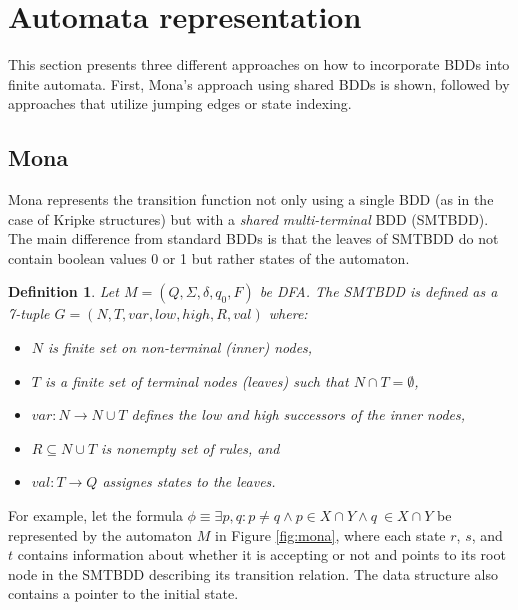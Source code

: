 \documentclass[pdflatex,sn-mathphys-num]{sn-jnl}%
\theoremstyle{thmstyleone}%
\theoremstyle{thmstyletwo}%
\theoremstyle{thmstylethree}%
\newtheorem{definition}{Definition}%
\begin{document}
\section{Automata representation}
    This section presents three different approaches on how to incorporate BDDs into finite automata. First, Mona's approach using shared BDDs is shown, followed by approaches that utilize jumping edges or state indexing.

    \subsection{Mona}
        Mona represents the transition function not only using a single BDD (as in the case of Kripke structures) but with a \textit{shared multi-terminal }BDD (SMTBDD). The main difference from standard BDDs is that the leaves of SMTBDD do not contain boolean values 0 or 1 but rather states of the automaton.

        \vspace*{0.5em}

        \begin{definition}
            Let $M = (Q, \Sigma, \delta, q_0, F)$ be DFA. The SMTBDD is defined as a 7-tuple $G = (N, T, var, low, high, R, val)$ where:
            \begin{itemize}[noindent]
                \item $N$ is finite set on non-terminal (inner) nodes,
                \item $T$ is a finite set of terminal nodes (leaves) such that $N \cap T = \emptyset$,
                \item $var : N \rightarrow N \cup T$ defines the low and high successors of the inner nodes,
                \item $R \subseteq N \cup T$ is nonempty set of rules, and
                \item $val : T \rightarrow Q$ assignes states to the leaves.
            \end{itemize}
        \end{definition}

        For example, let the formula $\phi \equiv \exists p, q : p \neq q \land p \in X \cap Y \land q \ \in X \cap Y$ be represented by the automaton $M$ in Figure \ref{fig:mona}, where each state $r$, $s$, and $t$ contains information about whether it is accepting or not and points to its root node in the SMTBDD describing its transition relation. The data structure also contains a pointer to the initial state.
\end{document}

